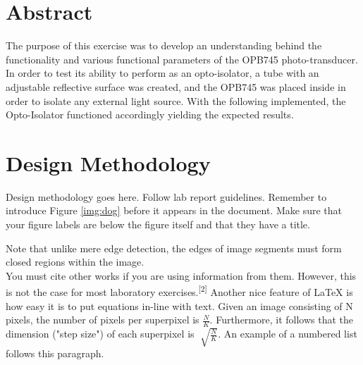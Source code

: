 \documentclass[CMPE]{KGCOEReport}
\begin{document}
\maketitle

\renewcommand\cftsecleader{\cftdotfill{\cftdotsep}} %
\tableofcontents
\newpage
\setcounter{secnumdepth}{0} %
\renewcommand\um{$\mu$m} %
\newcommand\ua{$\mu$a }
\newcommand{\ol}[1]{\overline{#1}}

\section{Abstract}
The purpose of this exercise was to develop an understanding behind the 
functionality and various functional parameters of the OPB745 
photo-transducer. In order to test its ability to perform as an opto-isolator,
a tube with an adjustable reflective surface was created, and the OPB745 was placed inside in order to isolate any 
external light source. With the following implemented, the Opto-Isolator 
functioned accordingly yielding the expected results. 


\section{Design Methodology}

Design methodology goes here. Follow lab report guidelines. Remember to introduce Figure \ref{img:dog} before it appears in the document. Make sure that your figure labels are below the figure itself and that they have a title.


Note that unlike mere edge detection, the edges of image segments must form closed regions within the image. \\

You must cite other works if you are using information from them. However, this is not the case for most laboratory exercises.\textsuperscript{[2]} Another nice feature of LaTeX is how easy it is to put equations in-line with text. Given an image consisting of N pixels, the number of pixels per superpixel is $\frac{N}{K}$. Furthermore, it follows that the dimension ("step size") of each superpixel is $\sqrt[]{\frac{N}{K}}$. An example of a numbered list follows this paragraph.
\end{document}
